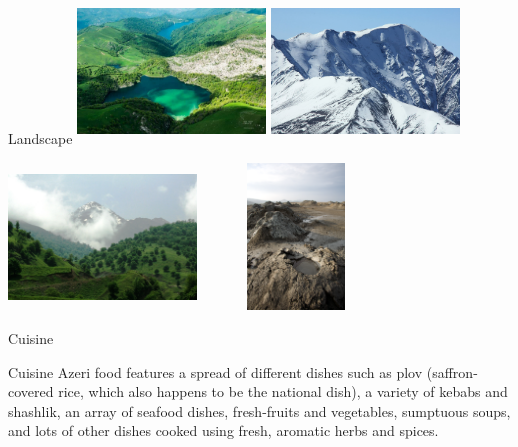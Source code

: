 \documentclass[hyperref={pdfpagemode=FullScreen}]{beamer}
\begin{document}
\begin{frame}{Landscape}
\centering
\includegraphics[width=5cm, height=3.9cm]{img/lake01.jpg}
\includegraphics[width=5cm, height=3.9cm]{img/mount01.jpg}

\vspace{0.5mm}
\includegraphics[width=5cm, height=3.9cm]{img/mount02.jpg}
\includegraphics[width=5cm, height=3.9cm]{img/vul01.png}
\end{frame}

\begin{frame}{Cuisine}
\begin{alertblock}{Cuisine}
\justifying Azeri food features a spread of different dishes such as plov (saffron-covered rice, which also happens to be the national dish), a variety of kebabs and shashlik, an array of seafood dishes, fresh-fruits and vegetables, sumptuous soups, and lots of other dishes cooked using fresh, aromatic herbs and spices.
\end{alertblock}
\end{frame}
\end{document}
